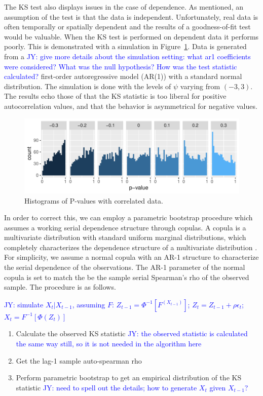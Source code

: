 \documentclass[12pt, letterpaper, titlepage]{article}
\newcommand{\jy}[1]{\textcolor{blue}{JY: #1}}
\begin{document}
The KS test also displays issues in the case of dependence. As mentioned, an assumption of the 
test is that the data is independent. Unfortunately, real data is often temporally
or spatially dependent and the results of a goodness-of-fit test would be valuable. 
When the KS test is performed on dependent data it performs poorly. This is demonstrated
with a simulation in Figure~\ref{fig:hist_correlation}. Data is generated from a
\jy{give more details about the simulation setting: what ar1 coefficients were
  considered? What was the null hypothesis? How was the test statistic calculated?}
first-order autoregressive model (AR(1)) with a standard normal distribution. The simulation
is done with the levels of $\psi$ varying from $(-3,3)$. The results echo those of \citet{Durilleul}
that the KS statistic is too liberal for positive autocorrelation values, and 
that the behavior is asymmetrical for negative values.

\begin{figure}[tbp]
  \centering
  \includegraphics{hist_correlation}
  \caption{Histograms of P-values with correlated data.}
  \label{fig:hist_correlation}
\end{figure}

In order to correct this, we can employ a parametric bootstrap procedure which
assumes a working serial dependence structure through copulas. A copula is a
multivariate distribution with standard uniform marginal distributions, which
completely characterizes the dependence structure of a multivariate
distribution \cite{copula, book}. For simplicity, we assume a normal copula with
an AR-1 structure to characterize the serial dependence of the observations. The
AR-1 parameter of the normal copula is set to match the be the sample serial
Spearman's rho of the observed sample. The procedure is as follows.


\jy{simulate $X_t | X_{t-1}$, assuming $F$:
  $Z_{t-1} = \Phi^{-1}[ F^(X_{t-1})]$;
  $Z_{t} = Z_{t -1} + \rho \epsilon_t$;
  $X_t = F^{-1} [ \Phi(Z_t) ]$
  }
  
\begin{enumerate}
  \item Calculate the observed KS statistic \jy{the observed statistic is
      calculated the same way still, so it is not needed in the algorithm here}
  \item Get the lag-1 sample auto-spearman rho
  \item Perform parametric bootstrap to get an empirical distribution of the KS
    statistic
    \jy{need to spell out the details; how to generate $X_t$ given $X_{t-1}$?}
\end{enumerate}
\end{document}

